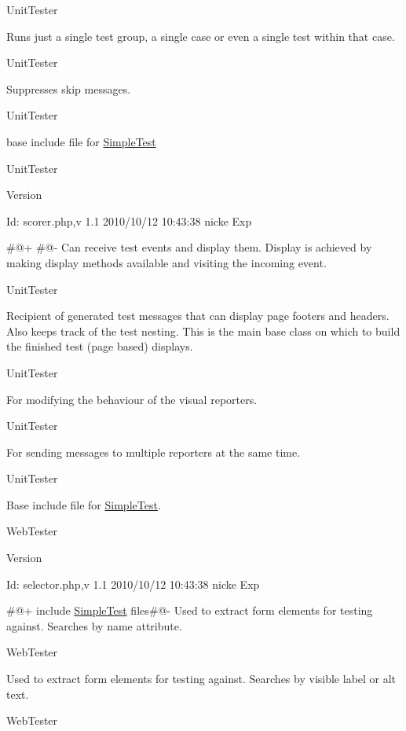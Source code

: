 UnitTester

Runs just a single test group, a single case or even a single test within that case.

UnitTester

Suppresses skip messages.

UnitTester

base include file for \hyperlink{class_simple_test}{SimpleTest}

UnitTester \begin{DoxyVersion}{Version}

\end{DoxyVersion}
\begin{DoxyParagraph}{Id:}
scorer.php,v 1.1 2010/10/12 10:43:38 nicke Exp 
\end{DoxyParagraph}


\#@+ \#@-\/ Can receive test events and display them. Display is achieved by making display methods available and visiting the incoming event.

UnitTester 

Recipient of generated test messages that can display page footers and headers. Also keeps track of the test nesting. This is the main base class on which to build the finished test (page based) displays.

UnitTester

For modifying the behaviour of the visual reporters.

UnitTester

For sending messages to multiple reporters at the same time.

UnitTester

Base include file for \hyperlink{class_simple_test}{SimpleTest}.

WebTester \begin{DoxyVersion}{Version}

\end{DoxyVersion}
\begin{DoxyParagraph}{Id:}
selector.php,v 1.1 2010/10/12 10:43:38 nicke Exp 
\end{DoxyParagraph}


\#@+ include \hyperlink{class_simple_test}{SimpleTest} files\#@-\/ Used to extract form elements for testing against. Searches by name attribute.

WebTester

Used to extract form elements for testing against. Searches by visible label or alt text.

WebTester

